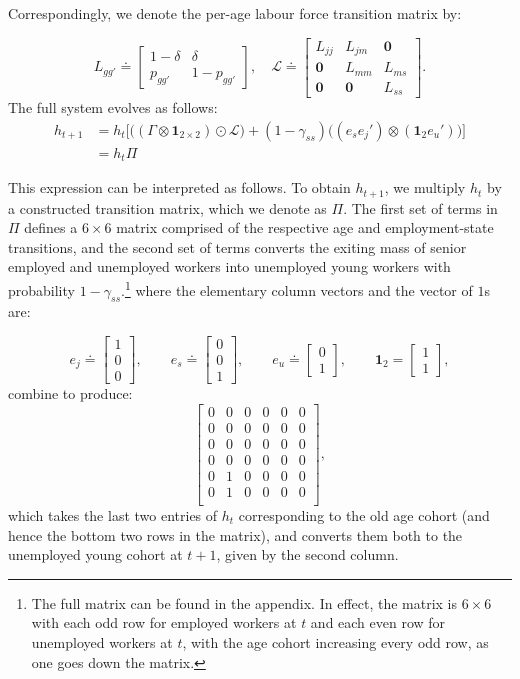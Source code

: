 \documentclass{article}
\begin{document}
Correspondingly, we denote the per-age labour force transition matrix by:

\[
L_{gg'}
\doteq
\begin{bmatrix}
1-\delta & \delta \\
p_{gg'} & 1-p_{gg'}
\end{bmatrix},\quad
\mathcal L
\doteq
\begin{bmatrix}
L_{jj} & L_{jm} & \mathbf{0} \\
\mathbf{0} & L_{mm} & L_{ms} \\
\mathbf{0} & \mathbf{0} & L_{ss}
\end{bmatrix}.
\]
The full system evolves as follows:
\begin{align*}
h_{t+1}&=h_t\bigr[\bigl((\Gamma\otimes\mathbf{1}_{2\times 2})\odot\mathcal{L}\bigr)+(1-\gamma_{ss})\bigl((e_s e_j')\otimes(\mathbf 1_2 e_u')\bigr)\bigl]\\
&=h_t\Pi
\end{align*}

This expression can be interpreted as follows. To obtain $h_{t+1}$, we multiply $h_t$ by a constructed transition matrix, which we denote as $\Pi$. The first set of terms in $\Pi$ defines a $6\times6$ matrix comprised of the respective age and employment-state transitions, and the second set of terms converts the exiting mass of senior employed and unemployed workers into unemployed young workers with probability $1-\gamma_{ss}$.\footnote{The full matrix can be found in the appendix. In effect, the matrix is $6\times6$ with each odd row for employed workers at $t$ and each even row for unemployed workers at $t$, with the age cohort increasing every odd row, as one goes down the matrix.} where the elementary column vectors and the vector of $1$s are:

\[
e_j\doteq
\begin{bmatrix}1\\0\\0\end{bmatrix},
\qquad
e_s\doteq
\begin{bmatrix}0\\0\\1\end{bmatrix},
\qquad
e_u\doteq
\begin{bmatrix}0\\1\end{bmatrix},
\qquad
\mathbf 1_2=
\begin{bmatrix}1\\1\end{bmatrix},
\]
combine to produce:
\[
\begin{bmatrix}
0 & 0 & 0 & 0 & 0 & 0 \\
0 & 0 & 0 & 0 & 0 & 0 \\
0 & 0 & 0 & 0 & 0 & 0 \\
0 & 0 & 0 & 0 & 0 & 0 \\
0 & 1 & 0 & 0 & 0 & 0 \\
0 & 1 & 0 & 0 & 0 & 0 \\
\end{bmatrix},
\]
which takes the last two entries of $h_t$ corresponding to the old age cohort (and hence the bottom two rows in the matrix), and converts them both to the unemployed young cohort at $t+1$, given by the second column.
\end{document}
